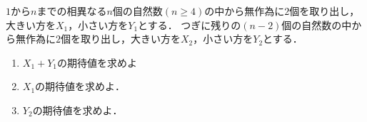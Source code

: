 $1$から$n$までの相異なる$n$個の自然数$(n\ge 4)$の中から無作為に$2$個を取り出し，大きい方を$X_1$，小さい方を$Y_1$とする．
つぎに残りの$(n-2)$個の自然数の中から無作為に$2$個を取り出し，大きい方を$X_2$，小さい方を$Y_2$とする．
\begin{enumerate}
  \item $X_1+Y_1$の期待値を求めよ
  \item $X_1$の期待値を求めよ．
  \item $Y_2$の期待値を求めよ．
\end{enumerate}